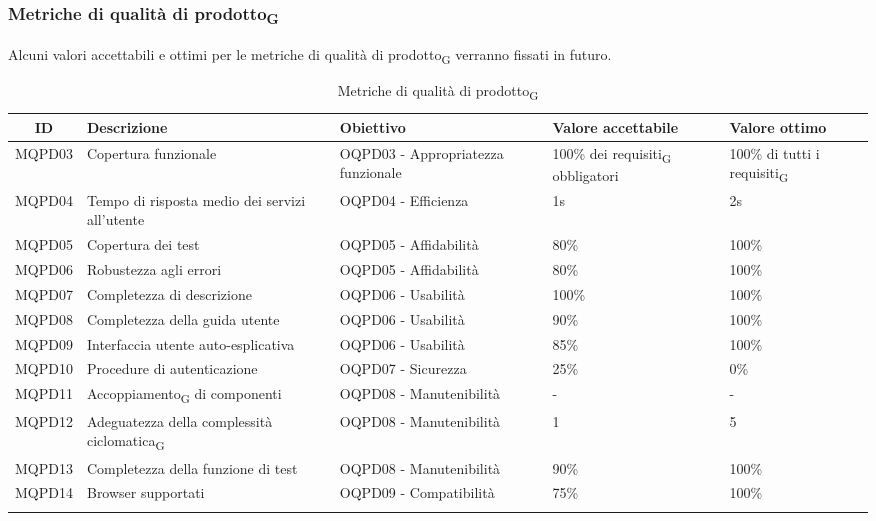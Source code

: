 \newpage
\subsubsection{Metriche di qualità di prodotto\textsubscript{G}}
Alcuni valori accettabili e ottimi per le metriche di qualità di prodotto\textsubscript{G} verranno fissati in futuro.
\begin{center}
	\setlength\extrarowheight{2pt}
	\begin{xltabular}{\textwidth}{|c|X|X|X|X|}
		\hline
		\textbf{ID} & \textbf{Descrizione} & \textbf{Obiettivo} & \textbf{Valore accettabile} & \textbf{Valore ottimo}\\
		\hline
		MQPD03 & Copertura funzionale & OQPD03 - Appropriatezza funzionale & 100\% dei requisiti\textsubscript{G} obbligatori & 100\% di tutti i requisiti\textsubscript{G}\\
		\hline
		MQPD04 & Tempo di risposta medio dei servizi all'utente & OQPD04 - Efficienza & 1s & 2s \\
		\hline
		MQPD05 & Copertura dei test & OQPD05 - Affidabilità & 80\% & 100\% \\
		\hline
		MQPD06 & Robustezza agli errori & OQPD05 - Affidabilità & 80\% & 100\% \\
		\hline
		MQPD07 & Completezza di descrizione & OQPD06 - Usabilità & 100\% &  100\% \\
		\hline
		MQPD08 & Completezza della guida utente & OQPD06 - Usabilità & 90\% &  100\% \\
		\hline
		MQPD09 & Interfaccia utente auto-esplicativa & OQPD06 - Usabilità & 85\% &  100\% \\
		\hline
		MQPD10 & Procedure di autenticazione & OQPD07 - Sicurezza & 25\% &  0\% \\
		\hline
		MQPD11 & Accoppiamento\textsubscript{G} di componenti & OQPD08 - Manutenibilità & - & - \\
		\hline
		MQPD12 & Adeguatezza della complessità ciclomatica\textsubscript{G} & OQPD08 - Manutenibilità & 1 & 5 \\
		\hline
		MQPD13 & Completezza della funzione di test & OQPD08 - Manutenibilità & 90\% & 100\% \\
		\hline
		MQPD14 & Browser supportati & OQPD09 - Compatibilità & 75\% & 100\% \\
		\hline
		\caption{Metriche di qualità di prodotto\textsubscript{G}}
	\end{xltabular}
\end{center}
